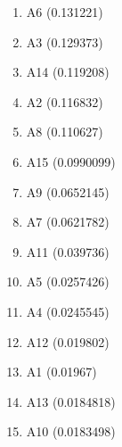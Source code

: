 \begin{enumerate}
\item A6 (0.131221)
\item A3 (0.129373)
\item A14 (0.119208)
\item A2 (0.116832)
\item A8 (0.110627)
\item A15 (0.0990099)
\item A9 (0.0652145)
\item A7 (0.0621782)
\item A11 (0.039736)
\item A5 (0.0257426)
\item A4 (0.0245545)
\item A12 (0.019802)
\item A1 (0.01967)
\item A13 (0.0184818)
\item A10 (0.0183498)
\end{enumerate}